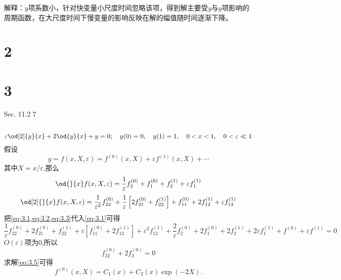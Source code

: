 \documentclass[12pt]{article}
\begin{document}
解释：$\dot{y}$项系数小，针对快变量小尺度时间忽略该项，得到解主要受$\ddot{y}$与$y$项影响的周期函数，在大尺度时间下慢变量的影响反映在解的幅值随时间逐渐下降。

\section{2}



\section{3}
Sec. 11.2 7 

\subsection{}

\begin{equation}
	\varepsilon \od[2]{y}{x} +2 \od{y}{x} +y=0 ;\quad y(0) = 0,\quad y(1) = 1, \quad 0<x<1, \quad 0<\varepsilon \ll 1
	\label{eq:3.1}
\end{equation}
假设
\begin{equation}
	y = f(x,X,\varepsilon) = f^{(0)}(x,X) + \varepsilon f^{(1)}(x,X) + \cdots
	\label{eq:3.2}
\end{equation}
其中$X=x/\varepsilon$,那么
\begin{equation}
	\od{}{x} f(x,X,\varepsilon) = \frac{1}{\varepsilon} f^{(0)}_2 + f^{(0)}_1 + f^{(1)}_2 + \varepsilon f^{(1)}_1
	\label{eq:3.3}
\end{equation}
\begin{equation}
	\od[2]{}{x} f(x,X,\varepsilon) = \frac{1}{\varepsilon^2} f^{(0)}_{22} + \frac{1}{\varepsilon} \left[ 2f^{(0)}_{21} + f^{(1)}_{22} \right] + f^{(0)}_{11} + 2 f^{(1)}_{12} + \varepsilon f^{(1)}_{12}
	\label{eq:3.4}
\end{equation}
把\cref{eq:3.1,eq:3.2,eq:3.3}代入\cref{eq:3.1}可得
\begin{equation}
	\frac{1}{\varepsilon} f^{(0)}_{22} + 2f^{(0)}_{21} + f^{(1)}_{22}  + \varepsilon \left[ f^{(0)}_{11} + 2 f^{(1)}_{12} \right] + \varepsilon^2 f^{(1)}_{12} + \frac{2}{\varepsilon} f^{(0)}_2 + 2f^{(0)}_1 + 2f^{(1)}_2 + 2\varepsilon f^{(1)}_1 + f^{(0)} + \varepsilon f^{(1)}= 0
\end{equation}
$O(\varepsilon)$项为$0$,所以
\begin{equation}
	f^{(0)}_{22} + 2f^{(0)}_2 = 0
	\label{eq:3.5}
\end{equation}
求解\cref{eq:3.5}可得
\begin{equation}
	f^{(0)}(x,X) = C_1(x) + C_2(x) \exp{(-2X)}.
	\label{eq:3.6}
\end{equation}
\end{document}
